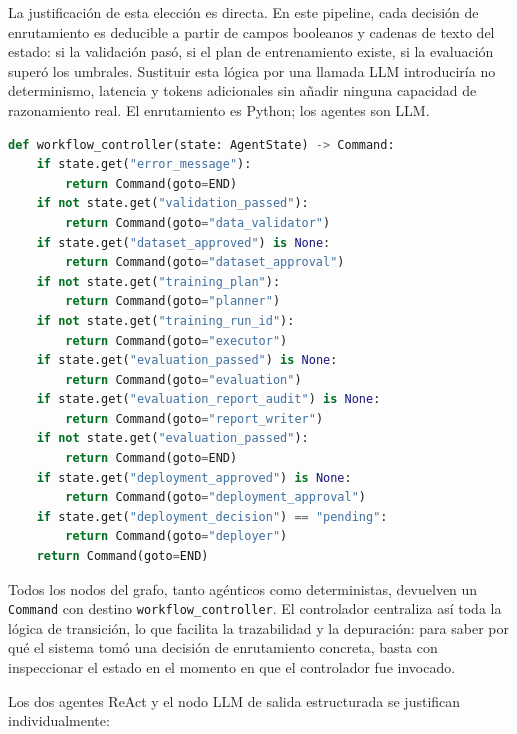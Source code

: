 La justificación de esta elección es directa. En este pipeline, cada decisión de enrutamiento es deducible a partir de campos booleanos y cadenas de texto del estado: si la validación pasó, si el plan de entrenamiento existe, si la evaluación superó los umbrales. Sustituir esta lógica por una llamada LLM introduciría no determinismo, latencia y tokens adicionales sin añadir ninguna capacidad de razonamiento real. El enrutamiento es Python; los agentes son LLM.

\begin{lstlisting}[language=Python, caption={Extracto simplificado del controlador de flujo.}, label={lst:workflow-controller}]
def workflow_controller(state: AgentState) -> Command:
    if state.get("error_message"):
        return Command(goto=END)
    if not state.get("validation_passed"):
        return Command(goto="data_validator")
    if state.get("dataset_approved") is None:
        return Command(goto="dataset_approval")
    if not state.get("training_plan"):
        return Command(goto="planner")
    if not state.get("training_run_id"):
        return Command(goto="executor")
    if state.get("evaluation_passed") is None:
        return Command(goto="evaluation")
    if state.get("evaluation_report_audit") is None:
        return Command(goto="report_writer")
    if not state.get("evaluation_passed"):
        return Command(goto=END)
    if state.get("deployment_approved") is None:
        return Command(goto="deployment_approval")
    if state.get("deployment_decision") == "pending":
        return Command(goto="deployer")
    return Command(goto=END)
\end{lstlisting}

Todos los nodos del grafo, tanto agénticos como deterministas, devuelven un \texttt{Command} con destino \texttt{workflow\_controller}. El controlador centraliza así toda la lógica de transición, lo que facilita la trazabilidad y la depuración: para saber por qué el sistema tomó una decisión de enrutamiento concreta, basta con inspeccionar el estado en el momento en que el controlador fue invocado.

Los dos agentes ReAct y el nodo LLM de salida estructurada se justifican individualmente:


